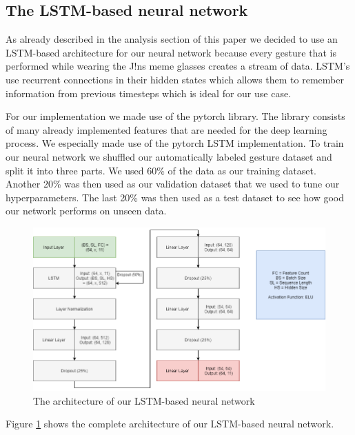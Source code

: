 \documentclass[runningheads]{llncs}
\begin{document}
\subsection{The LSTM-based neural network}

As already described in the analysis section of this paper we decided to use an LSTM-based architecture for our neural network because every gesture that is performed while wearing the J!ns meme glasses creates a stream of data. LSTM's use recurrent connections in their hidden states which allows them to remember information from previous timesteps which is ideal for our use case.
\par
For our implementation we made use of the pytorch library. The library consists of many already implemented features that are needed for the deep learning process. We especially made use of the pytorch LSTM implementation. To train our neural network we shuffled our automatically labeled gesture dataset and split it into three parts. We used 60\% of the data as our training dataset. Another 20\% was then used as our validation dataset that we used to tune our hyperparameters. The last 20\% was then used as a test dataset to see how good our network performs on unseen data.
\begin{center}
\begin{figure}
\includegraphics[width=\textwidth]{LSTM_Architecture.png}
\caption{The architecture of our LSTM-based neural network}
\label{fig:lstmarchitecture}
\end{figure}
\end{center}
Figure \ref{fig:lstmarchitecture} shows the complete architecture of our LSTM-based neural network.
\end{document}
